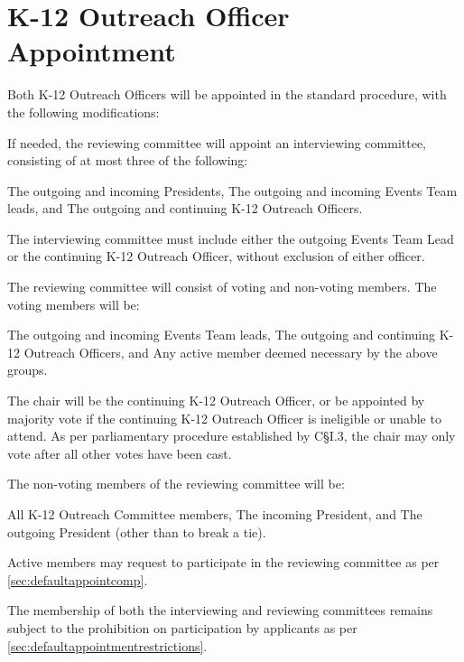 \section{K-12 Outreach Officer Appointment} Both K-12 Outreach Officers will be appointed in the standard procedure, with the following modifications:
\begin{enumsubsection}
\itemnotoc If needed, the reviewing committee will appoint an interviewing committee, consisting of at most three of the following:
\begin{enumsubsubsection}
\itemnotoc The outgoing and incoming Presidents,
\itemnotoc The outgoing and incoming Events Team leads, and
\itemnotoc The outgoing and continuing K-12 Outreach Officers.
\end{enumsubsubsection}
The interviewing committee must include either the outgoing Events Team Lead or the continuing K-12 Outreach Officer, without exclusion of either officer.

\itemnotoc The reviewing committee will consist of voting and non-voting members. The voting members will be:
\begin{enumsubsubsection}
\itemnotoc The outgoing and incoming Events Team leads,
\itemnotoc The outgoing and continuing K-12 Outreach Officers, and
\itemnotoc Any active member deemed necessary by the above groups.
\end{enumsubsubsection}
The chair will be the continuing K-12 Outreach Officer, or be appointed by majority vote if the continuing K-12 Outreach Officer is ineligible or unable to attend. As per parliamentary procedure established by C§I.3, the chair may only vote after all other votes have been cast.

\itemnotoc The non-voting members of the reviewing committee will be:
\begin{enumsubsubsection}
\itemnotoc All K-12 Outreach Committee members,
\itemnotoc The incoming President, and
\itemnotoc The outgoing President (other than to break a tie).
\end{enumsubsubsection}

\itemnotoc Active members may request to participate in the reviewing committee as per \textsection \ref{sec:defaultappointcomp}.

\itemnotoc The membership of both the interviewing and reviewing committees remains subject to the prohibition on participation by applicants as per \textsection \ref{sec:defaultappointmentrestrictions}.

\end{enumsubsection}


